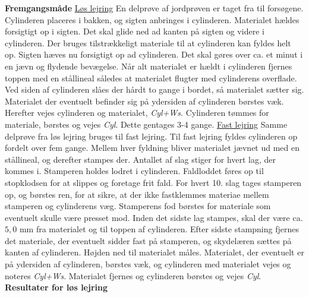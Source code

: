 \textbf{Fremgangsmåde}
\newline
\underline{Løs lejring}
\newline
En delprøve af jordprøven er taget fra til forsøgene. Cylinderen placeres i bakken, og sigten anbringes i cylinderen. Materialet hældes forsigtigt op i sigten. Det skal glide ned ad kanten på sigten og videre i cylinderen. Der bruges tilstrækkeligt materiale til at cylinderen kan fyldes helt op. Sigten hæves nu forsigtigt op ad cylinderen. Det skal gøres over ca. et minut  i en jævn og flydende bevægelse. Når alt materialet er hældt i cylinderen fjernes toppen med en stållineal således at materialet flugter med cylinderens overflade. Ved siden af cylinderen slåes der hårdt to gange i bordet, så materialet sætter sig. Materialet der eventuelt befinder sig på ydersiden af cylinderen børstes væk. Herefter vejes cylinderen og materialet, \textit{Cyl+Ws}. Cylinderen tømmes for materiale, børstes og vejes \textit{Cyl}. Dette gentages 3-4 gange.
\newline
\newline
\underline{Fast lejring}
\newline
Samme delprøve fra løs lejring bruges til fast lejring. Til fast lejring fyldes cylinderen op fordelt over fem gange. Mellem hver fyldning bliver materialet jævnet ud med en stållineal, og derefter stampes der. Antallet af slag stiger for hvert lag, der kommes i. Stamperen holdes lodret i cylinderen. Faldloddet føres op til stopklodsen for at slippes og foretage frit fald. For hvert 10. slag tages stamperen op, og børstes ren, for at sikre, at der ikke fastklemmes materiae mellem stamperen og cylinderens væg. Stamperens fod børstes for materiale som eventuelt skulle være presset mod. Inden det sidste lag stampes, skal der være ca. $5,\!0$ mm fra materialet og til toppen af cylinderen. Efter sidste stampning fjernes det materiale, der eventuelt sidder fast på stamperen, og skydelæren sættes på kanten af cylinderen. Højden ned til materialet måles. Materialet, der eventuelt er på ydersiden af cylinderen, børstes væk, og cylinderen med materialet vejes og noteres \textit{Cyl+Ws}. Materialet fjernes og cylinderen børstes og vejes \textit{Cyl}.
\newline
\newline
\textbf{Resultater for løs lejring}
